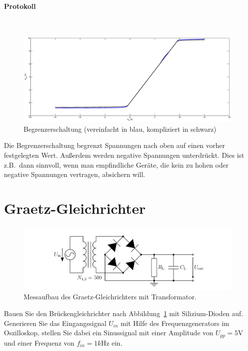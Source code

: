 \documentclass[10pt]{scrreprt}
\begin{document}
    \paragraph{Protokoll}
    $ $
    \begin{figure}[H]
        \includegraphics[width=\textwidth]{BegrGes}
        \caption{Begrenzerschaltung (vereinfacht in blau, kompliziert in schwarz)}
    \end{figure}

    Die Begrenzerschaltung begrenzt Spannungen nach oben auf einen vorher
    festgelegten Wert. Außerdem werden negative Spannungen unterdrückt. Dies ist
    z.B.~dann sinnvoll, wenn man empfindliche Geräte, die kein zu hohen oder negative
    Spannungen vertragen, absichern will.

    \section{Graetz-Gleichrichter}
    \begin{figure}[H]
        \centering
        \includegraphics[width=\textwidth]{abb15.png}
        \caption{Messaufbau des Graetz-Gleichrichters mit Transformator.}
        \label{fig:abb15}
    \end{figure}
    Bauen Sie den Brückengleichrichter nach Abbildung~\ref{fig:abb15} mit Silizium-Dioden auf.
    Generieren Sie das Eingangssignal $U_{in}$ mit Hilfe des Frequenzgenerators im Oszilloskop, stellen
    Sie dabei ein Sinussignal mit einer Amplitude von $U_{pp} = 5\si{\volt}$ und einer Frequenz von
    $f_{in} = 1\si{k\hertz}$ ein.
\end{document}

